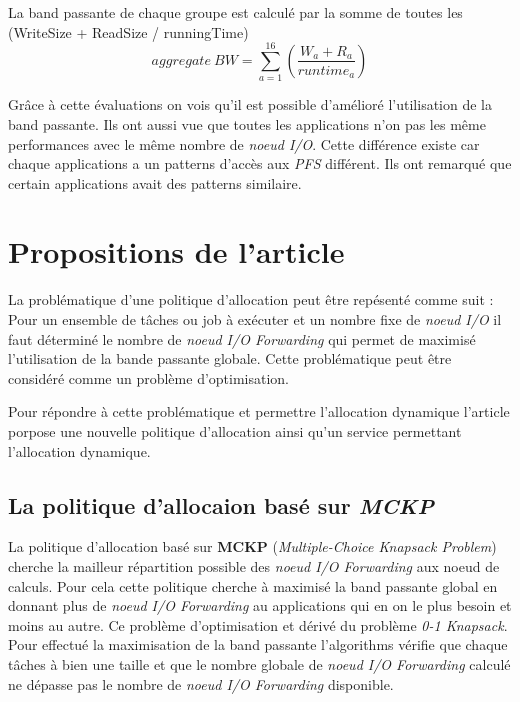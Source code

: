 \documentclass[10pt, a4paper]{article}
\begin{document}
La band passante de chaque groupe est calculé par la somme de toutes les (WriteSize + ReadSize / runningTime)
\begin{equation*}aggregate\ BW=\sum_{a=1}^{16}\left(\frac{W_{a}+R_{a}}{runtime_{a}}\right) \tag{2}\end{equation*}

Grâce à cette évaluations on vois qu'il est possible d'amélioré l'utilisation de la band passante.
Ils ont aussi vue que toutes les applications n'on pas les même performances avec le même nombre de \emph{noeud I/O}. Cette différence existe car chaque applications a un patterns d'accès aux \emph{PFS} différent. Ils ont remarqué que certain applications avait des patterns similaire.

\section{Propositions de l'article}

La problématique d'une politique d'allocation peut être repésenté comme suit :
Pour un ensemble de tâches ou job à exécuter et un nombre fixe de \emph{noeud I/O} il faut déterminé le nombre de \emph{noeud I/O Forwarding} qui permet de maximisé l'utilisation de la bande passante globale.
Cette problématique peut être considéré comme un problème d'optimisation.

Pour répondre à cette problématique et permettre l'allocation dynamique l'article porpose une nouvelle politique d'allocation ainsi qu'un service permettant l'allocation dynamique.

\subsection{La politique d'allocaion basé sur \emph{MCKP}}

La politique d'allocation basé sur \textbf{MCKP} (\emph{Multiple-Choice Knapsack Problem}) cherche la mailleur répartition possible des \emph{noeud I/O Forwarding} aux noeud de calculs.
Pour cela cette politique cherche à maximisé la band passante global en donnant plus de \emph{noeud I/O Forwarding} au applications qui en on le plus besoin et moins au autre. Ce problème d'optimisation et dérivé du problème \emph{0-1 Knapsack}.
Pour effectué la maximisation de la band passante l'algorithms vérifie que chaque tâches à bien une taille et que le nombre globale de \emph{noeud I/O Forwarding} calculé ne dépasse pas le nombre de \emph{noeud I/O Forwarding} disponible.
\end{document}
